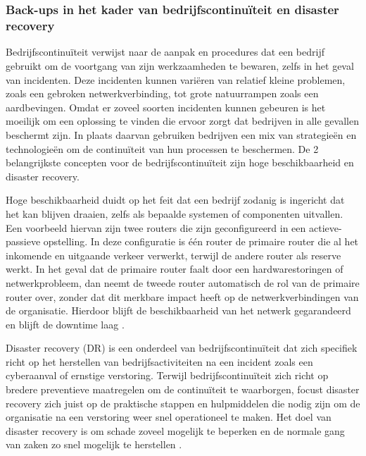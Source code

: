 \chapter{}%
\label{ch:Literatuurstudie}

\subsection{Back-ups in het kader van bedrijfscontinuïteit en disaster recovery}
Bedrijfscontinuïteit verwijst naar de aanpak en procedures dat een bedrijf gebruikt om de voortgang van zijn werkzaamheden te bewaren, zelfs in het geval van incidenten. Deze incidenten kunnen variëren van relatief kleine problemen, zoals een gebroken netwerkverbinding, tot grote natuurrampen zoals een aardbevingen. Omdat er zoveel soorten incidenten kunnen gebeuren is het moeilijk om een oplossing te vinden die ervoor zorgt dat bedrijven in alle gevallen beschermt zijn. In plaats daarvan gebruiken bedrijven een mix van strategieën en technologieën om de continuïteit van hun processen te beschermen. De 2 belangrijkste concepten voor de bedrijfscontinuïteit zijn hoge beschikbaarheid en disaster recovery.

Hoge beschikbaarheid duidt op het feit dat een bedrijf zodanig is ingericht dat het kan blijven draaien, zelfs als bepaalde systemen of componenten uitvallen. Een voorbeeld hiervan zijn twee routers die zijn geconfigureerd in een actieve-passieve opstelling. In deze configuratie is één router de primaire router die al het inkomende en uitgaande verkeer verwerkt, terwijl de andere router als reserve werkt. In het geval dat de primaire router faalt door een hardwarestoringen of netwerkprobleem, dan neemt de tweede router automatisch de rol van de primaire router over, zonder dat dit merkbare impact heeft op de netwerkverbindingen van de organisatie. Hierdoor blijft de beschikbaarheid van het netwerk gegarandeerd en blijft de downtime laag \autocite{Zhu2015}.

Disaster recovery (DR) is een onderdeel van bedrijfscontinuïteit dat zich specifiek richt op het herstellen van bedrijfsactiviteiten na een incident zoals een cyberaanval of ernstige verstoring. Terwijl bedrijfscontinuïteit zich richt op bredere preventieve maatregelen om de continuïteit te waarborgen, focust disaster recovery zich juist op de praktische stappen en hulpmiddelen die nodig zijn om de organisatie na een verstoring weer snel operationeel te maken. Het doel van disaster recovery is om schade zoveel mogelijk te beperken en de normale gang van zaken zo snel mogelijk te herstellen .
 
